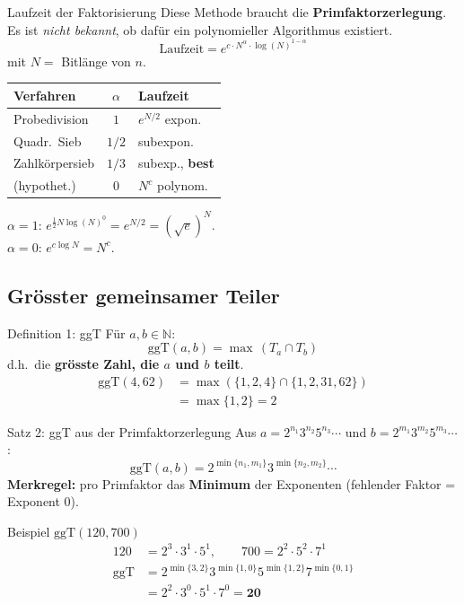 \documentclass[a4paper, fontsize=7pt]{scrartcl}
\def\N{\mathbb{N}}  %
\renewcommand*{\arraystretch}{1.5}  %
\begin{document}
\begin{subbox}{Laufzeit der Faktorisierung}
Diese Methode braucht die \textbf{Primfaktorzerlegung}. Es ist \emph{nicht
bekannt}, ob dafür ein polynomieller Algorithmus existiert.
$$\text{Laufzeit} = e^{c \cdot N^\alpha \cdot \log(N)^{1-\alpha}}$$
mit $N = $ Bitlänge von $n$.
\renewcommand*{\arraystretch}{1.15}
\setlength{\tabcolsep}{3pt}
\begin{tabularx}{\linewidth}{@{}>{\raggedright\arraybackslash}X|c|l@{}}
\textbf{Verfahren} & $\alpha$ & \textbf{Laufzeit} \\
\hline
Probedivision & $1$ & $e^{N/2}$ expon. \\
Quadr.\ Sieb & $1/2$ & subexpon. \\
Zahlkörpersieb & $1/3$ & subexp., \textbf{best} \\
(hypothet.) & $0$ & $N^c$ polynom. \\
\end{tabularx}
$\alpha = 1$: $e^{\frac12 N \log(N)^0} = e^{N/2} = (\sqrt{e})^N$.\\
$\alpha = 0$: $e^{c\log N} = N^c$.
\end{subbox}

\subsection{Grösster gemeinsamer Teiler}

\begin{mainbox}{Definition 1: ggT}
Für $a,b \in \N$:
$$\boxed{\mathrm{ggT}(a,b) = \max\,(T_a \cap T_b)}$$
d.h.\ die \textbf{grösste Zahl, die $a$ und $b$ teilt}.
\begin{align*}
\mathrm{ggT}(4,62) &= \max(\{1,2,4\} \cap \{1,2,31,62\})\\
 &= \max\{1,2\} = 2
\end{align*}
\end{mainbox}

\begin{mainbox}{Satz 2: ggT aus der Primfaktorzerlegung}
Aus $a = 2^{n_1} 3^{n_2} 5^{n_3}\cdots$ und
$b = 2^{m_1} 3^{m_2} 5^{m_3}\cdots$:
$$\boxed{\mathrm{ggT}(a,b) = 2^{\min\{n_1,m_1\}}
  3^{\min\{n_2,m_2\}} \cdots}$$
\textbf{Merkregel:} pro Primfaktor das \textbf{Minimum} der Exponenten
(fehlender Faktor = Exponent $0$).
\end{mainbox}

\begin{subbox}{Beispiel $\mathrm{ggT}(120,700)$}
\begin{align*}
120 &= 2^3 \cdot 3^1 \cdot 5^1, \qquad 700 = 2^2 \cdot 5^2 \cdot 7^1\\
\mathrm{ggT} &= 2^{\min\{3,2\}} 3^{\min\{1,0\}} 5^{\min\{1,2\}}
  7^{\min\{0,1\}}\\
 &= 2^2 \cdot 3^0 \cdot 5^1 \cdot 7^0 = \mathbf{20}
\end{align*}
\end{subbox}
\end{document}
